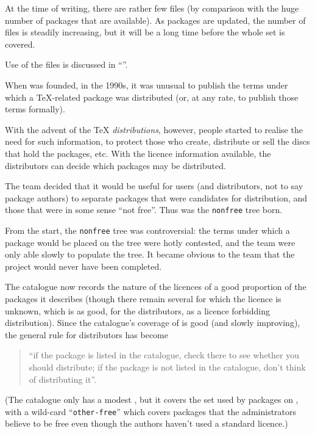 At the time of writing, there are rather few 
files (by comparison with the huge number of packages that are
available).  As packages are updated, the number of files is
steadily increasing, but it will be a long time before the whole set
is covered.

Use of the files is discussed in %
``''.


When  was founded, in the 1990s, it was unusual to publish
the terms under which a \TeX{}-related package was distributed (or, at
any rate, to publish those terms formally).

With the advent of the \TeX{} \emph{distributions}, however, people
started to realise the need for such information, to protect those who
create, distribute or sell the discs that hold the packages, etc.
With the licence information available, the distributors can decide
which packages may be distributed.

The  team decided that it would be useful for users (and
distributors, not to say package authors) to separate packages that
were candidates for distribution, and those that were in some sense
``not free''.  Thus was the \texttt{nonfree} tree born.

From the start, the \texttt{nonfree} tree was controversial: the terms
under which a package would be placed on the tree were hotly
contested, and the  team were only able slowly to populate
the tree.  It became obvious to the team that the project would never
have been completed.

The  catalogue now records the nature of the licences of a
good proportion of the packages it describes (though there remain
several for which the licence is unknown, which is as good, for the
distributors, as a licence forbidding distribution).  Since the
catalogue's coverage of  is good (and slowly improving),
the general rule for distributors has become
\begin{quote}
``if the package is listed in the catalogue, check there to see
whether you should distribute; if the package is not listed in the
catalogue, don't think of distributing it''.
\end{quote}
(The catalogue only has a modest %
, but it covers the set used
by packages on , with a wild-card ``\texttt{other-free}''
which covers packages that the  administrators believe to
be free even though the authors haven't used a standard licence.)

